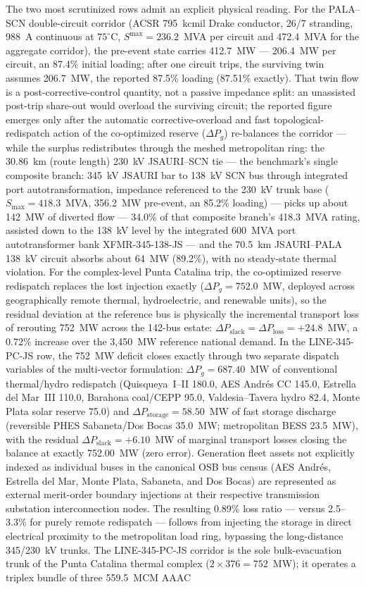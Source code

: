 The two most scrutinized rows admit an explicit physical reading. For the PALA--SCN double-circuit corridor (ACSR 795~kcmil Drake conductor, 26/7 stranding, 988~A continuous at $75^{\circ}$C, $S^{\max} = 236.2$~MVA per circuit and 472.4~MVA for the aggregate corridor), the pre-event state carries 412.7~MW --- 206.4~MW per circuit, an 87.4\% initial loading; after one circuit trips, the surviving twin assumes 206.7~MW, the reported 87.5\% loading (87.51\% exactly). That twin flow is a post-corrective-control quantity, not a passive impedance split: an unassisted post-trip share-out would overload the surviving circuit; the reported figure emerges only after the automatic corrective-overload and fast topological-redispatch action of the co-optimized reserve ($\Delta P_g$) re-balances the corridor --- while the surplus redistributes through the meshed metropolitan ring: the 30.86~km (route length) 230~kV JSAURI--SCN tie --- the benchmark's single composite branch: 345~kV JSAURI bar to 138~kV SCN bus through integrated port autotransformation, impedance referenced to the 230~kV trunk base ($S_{\max} = 418.3$~MVA, 356.2~MW pre-event, an 85.2\% loading) --- picks up about 142~MW of diverted flow --- 34.0\% of that composite branch's 418.3~MVA rating, assisted down to the 138~kV level by the integrated 600~MVA port autotransformer bank XFMR-345-138-JS --- and the 70.5~km JSAURI--PALA 138~kV circuit absorbs about 64~MW (89.2\%), with no steady-state thermal violation. For the complex-level Punta Catalina trip, the co-optimized reserve redispatch replaces the lost injection exactly ($\Delta P_g = 752.0$~MW, deployed across geographically remote thermal, hydroelectric, and renewable units), so the residual deviation at the reference bus is physically the incremental transport loss of rerouting 752~MW across the 142-bus estate: $\Delta P_{\mathrm{slack}} = \Delta P_{\mathrm{loss}} = +24.8$~MW, a 0.72\% increase over the 3,450~MW reference national demand. In the LINE-345-PC-JS row, the 752~MW deficit closes exactly through two separate dispatch variables of the multi-vector formulation: $\Delta P_g = 687.40$~MW of conventional thermal/hydro redispatch (Quisqueya~I--II 180.0, AES Andr\'es CC 145.0, Estrella del Mar~III 110.0, Barahona coal/CEPP 95.0, Valdesia--Tavera hydro 82.4, Monte Plata solar reserve 75.0) and $\Delta P_{\mathrm{storage}} = 58.50$~MW of fast storage discharge (reversible PHES Sabaneta/Dos Bocas 35.0~MW; metropolitan BESS 23.5~MW), with the residual $\Delta P_{\mathrm{slack}} = +6.10$~MW of marginal transport losses closing the balance at exactly 752.00~MW (zero error). Generation fleet assets not explicitly indexed as individual buses in the canonical OSB bus census (AES Andr\'es, Estrella del Mar, Monte Plata, Sabaneta, and Dos Bocas) are represented as external merit-order boundary injections at their respective transmission substation interconnection nodes. The resulting 0.89\% loss ratio --- versus 2.5--3.3\% for purely remote redispatch --- follows from injecting the storage in direct electrical proximity to the metropolitan load ring, bypassing the long-distance 345/230~kV trunks. The LINE-345-PC-JS corridor is the sole bulk-evacuation trunk of the Punta Catalina thermal complex ($2 \times 376 = 752$~MW); it operates a triplex bundle of three 559.5~MCM AAAC 